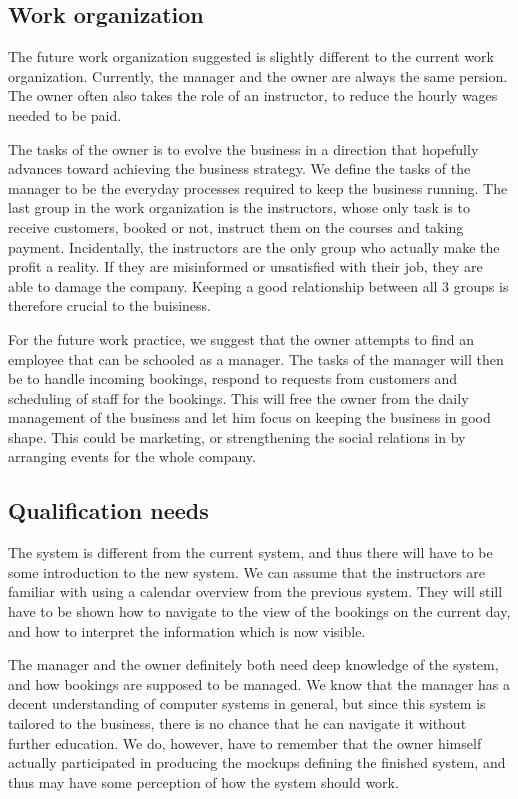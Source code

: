 \subsection{Work organization}
The future work organization suggested is slightly different to the current 
work organization. Currently, the manager and the owner are always the same 
persion. The owner often also takes the role of an instructor, to reduce the 
hourly wages needed to be paid. 

The tasks of the owner is to evolve the business in a direction that hopefully 
advances toward achieving the business strategy. We define the tasks of the 
manager to be the everyday processes required to keep the business running. The 
last group in the work organization is the instructors, whose only task is to
receive customers, booked or not, instruct them on the courses and taking 
payment. Incidentally, the instructors are the only group who actually make
the profit a reality. If they are misinformed or unsatisfied with their job, 
they are able to damage the company. Keeping a good relationship between all
3 groups is therefore crucial to the buisiness.

For the future work practice, we suggest that the owner attempts to find an 
employee that can be schooled as a manager. The tasks of the manager will then
be to handle incoming bookings, respond to requests from customers and 
scheduling of staff for the bookings. This will free the owner from the daily
management of the business and let him focus on keeping the business in good 
shape. This could be marketing, or strengthening the social relations in 
\gomonkey{} by arranging events for the whole company.

\subsection{Qualification needs}
The system is different from the current system, and thus there will have to be
some introduction to the new system. We can assume that the instructors are 
familiar with using a calendar overview from the previous system. They will 
still have to be shown how to navigate to the view of the bookings on the 
current day, and how to interpret the information which is now visible.

The manager and the owner definitely both need deep knowledge of the system, 
and how bookings are supposed to be managed. We know that the manager has a 
decent understanding of computer systems in general, but since this system
is tailored to the business, there is no chance that he can navigate it 
without further education. We do, however, have to remember that the owner
himself actually participated in producing the mockups defining the finished
system, and thus may have some perception of how the system should work.

